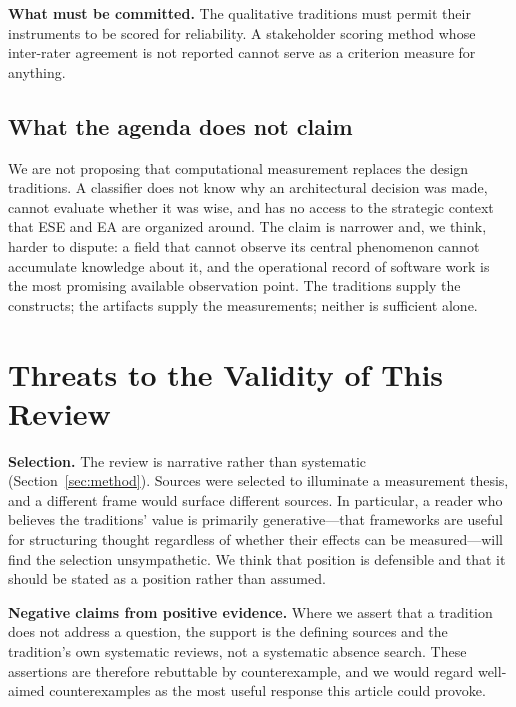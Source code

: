 \documentclass[11pt,a4paper]{article}
\begin{document}
\textbf{What must be committed.} The qualitative traditions must permit their
instruments to be scored for reliability. A stakeholder scoring method whose
inter-rater agreement is not reported cannot serve as a criterion measure for
anything.

\subsection{What the agenda does not claim}

We are not proposing that computational measurement replaces the design
traditions. A classifier does not know why an architectural decision was made,
cannot evaluate whether it was wise, and has no access to the strategic context
that ESE and EA are organized around. The claim is narrower and, we think,
harder to dispute: a field that cannot observe its central phenomenon cannot
accumulate knowledge about it, and the operational record of software work is
the most promising available observation point. The traditions supply the
constructs; the artifacts supply the measurements; neither is sufficient alone.

\section{Threats to the Validity of This Review}
\label{sec:threats}

\textbf{Selection.} The review is narrative rather than systematic
(Section~\ref{sec:method}). Sources were selected to illuminate a measurement
thesis, and a different frame would surface different sources. In particular, a
reader who believes the traditions' value is primarily generative---that
frameworks are useful for structuring thought regardless of whether their
effects can be measured---will find the selection unsympathetic. We think that
position is defensible and that it should be stated as a position rather than
assumed.

\textbf{Negative claims from positive evidence.} Where we assert that a
tradition does not address a question, the support is the defining sources and
the tradition's own systematic reviews, not a systematic absence search. These
assertions are therefore rebuttable by counterexample, and we would regard
well-aimed counterexamples as the most useful response this article could
provoke.
\end{document}
